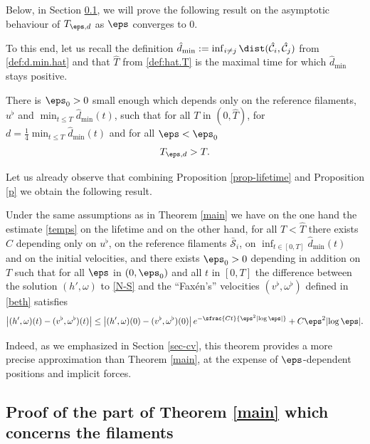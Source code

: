 Below, in Section \ref{section-cv-filament}, we will prove the following result on the asymptotic behaviour of $ T_{\eps,d}$ as $\eps$ converges to $0$.

To this end, let us recall
the definition $\hat d_{\min} := \inf_{i \neq j } \dist(\hat {\mathcal C }_i, \hat {\mathcal C }_j)$ from \eqref{def:d.min.hat}
and that $\hat T$ from \eqref{def:hat.T} is the maximal time for which $\hat d_{\min}$ stays positive.

\begin{Proposition}\label{prop-lifetime}
There is $\eps_0 >0 $ small enough which depends only on the reference filaments, $u^\flat$ and $\min_{t \leq T} \hat d_{\min}(t)$, such that {for all $T $ in $(0, \hat T)$,} for $d = \frac 1 4 \min_{t \leq T} \hat d_{\min}(t)$ and for all $\eps < \eps_0$
\begin{equation}
T_{\eps,d} > T.
\end{equation}
\end{Proposition}

Let us already observe that combining
Proposition \ref{prop-lifetime}
and Proposition \ref{p} we obtain the following result.

\begin{thm}\label{refinedqs}
Under the same assumptions as in Theorem
\ref{main}
we have on the one hand the estimate
\eqref{temps} on the lifetime
and on the other hand, for all $T < \hat T$ there exists $C$ depending only on $u^\flat$, on the reference filaments $\bar {\mathcal S}_i$, on $\inf_{t \in [0,T]} \hat d_{\min}(t)$ and on the initial velocities, and there exists $\eps_0 > 0$ depending in addition on $T$
such that for all $\eps $ in $(0, \eps_0)$ and all $t$ in $[0,T]$
the difference between the solution
$(h', \omega)$ to \eqref{N-S} and the ``Faxén's'' velocities $(v^\flat,\omega^\flat)$ defined in \eqref{beth} satisfies
\begin{equation} \label{eq:asymptotic.velocities}
\bigl| (h', \omega)(t) - (v^\flat, \omega^\flat)(t) \bigr| \leq \bigl| (h', \omega) (0) - (v^\flat,\omega^\flat) (0) \bigr| \, e^{- \sfrac{C t}{\eps^2 \left|\log \eps\right|}} + C \eps^2 {\left|\log \eps\right|}.
\end{equation}
\end{thm}
Indeed, as we emphasized in Section \ref{sec-cv}, this theorem provides a more precise approximation than Theorem \ref{main}, at the expense of $\eps$-dependent positions and implicit forces.

\subsection{Proof of the part of Theorem \ref{main} which concerns the filaments}
\label{section-cv-filament}


